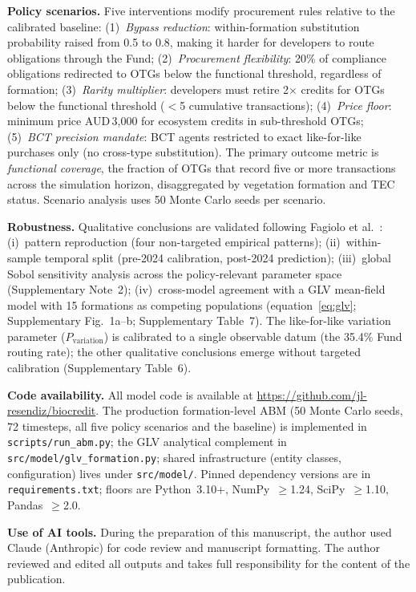 \documentclass[pdflatex,sn-nature,oneside]{sn-jnl}
\begin{document}
\textbf{Policy scenarios.}
Five interventions modify procurement rules relative to the calibrated baseline:
(1)~\textit{Bypass reduction}: within-formation substitution probability raised
from 0.5 to 0.8, making it harder for developers to route obligations through
the Fund;
(2)~\textit{Procurement flexibility}: 20\% of compliance obligations redirected to
OTGs below the functional threshold, regardless of formation;
(3)~\textit{Rarity multiplier}: developers must retire 2$\times$ credits for OTGs
below the functional threshold ($<$5 cumulative transactions);
(4)~\textit{Price floor}: minimum price AUD\,3,000 for ecosystem credits in
sub-threshold OTGs;
(5)~\textit{BCT precision mandate}: BCT agents restricted to exact like-for-like
purchases only (no cross-type substitution).
The primary outcome metric is \emph{functional coverage}, the fraction of
OTGs that record five or more transactions across the simulation horizon,
disaggregated by vegetation formation and TEC status.
Scenario analysis uses 50 Monte Carlo seeds per scenario.

\textbf{Robustness.}
Qualitative conclusions are validated following
Fagiolo et al.~\cite{Fagiolo2007}: (i)~pattern reproduction (four
non-targeted empirical patterns); (ii)~within-sample temporal split
(pre-2024 calibration, post-2024 prediction); (iii)~global Sobol
sensitivity analysis across the policy-relevant parameter space
(Supplementary Note~2); (iv)~cross-model agreement with a GLV mean-field
model with 15 formations as competing populations
(equation~\ref{eq:glv}; Supplementary Fig.~1a--b; Supplementary
Table~7).
The like-for-like variation parameter ($P_{\text{variation}}$) is
calibrated to a single observable datum (the 35.4\% Fund routing rate);
the other qualitative conclusions emerge without targeted calibration
(Supplementary Table~6).

\textbf{Code availability.}
All model code is available at \url{https://github.com/jl-resendiz/biocredit}.
The production formation-level ABM (50 Monte Carlo seeds, 72 timesteps,
all five policy scenarios and the baseline) is implemented in
\texttt{scripts/run\_abm.py}; the GLV analytical complement in
\texttt{src/model/glv\_formation.py}; shared infrastructure (entity
classes, configuration) lives under \texttt{src/model/}. Pinned
dependency versions are in \texttt{requirements.txt}; floors are
Python~3.10+, NumPy~$\geq$1.24, SciPy~$\geq$1.10, Pandas~$\geq$2.0.

\textbf{Use of AI tools.}
During the preparation of this manuscript, the author used Claude (Anthropic)
for code review and manuscript formatting. The author reviewed and edited all
outputs and takes full responsibility for the content of the publication.
\end{document}
